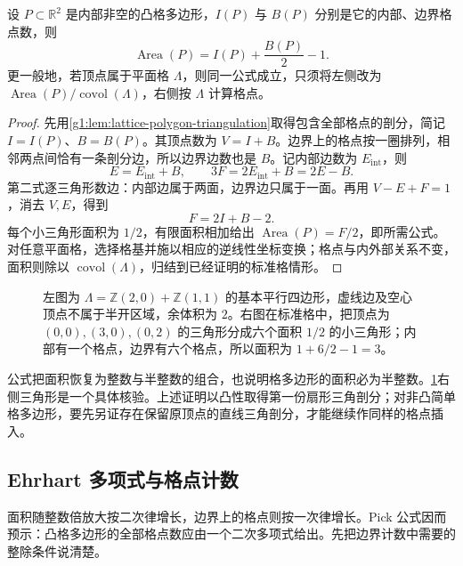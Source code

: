 \begin{theorem}[Pick 公式]
	\label{g1:thm:pick-formula}
	设 \(P\subset\mathbb R^2\) 是内部非空的凸格多边形，\(I(P)\) 与 \(B(P)\) 分别是它的内部、边界格点数，则
	\begin{equation}
		\label{g1:eq:pick-formula}
		\operatorname{Area}(P)=I(P)+\frac{B(P)}2-1.
	\end{equation}
	更一般地，若顶点属于平面格 \(\Lambda\)，则同一公式成立，只须将左侧改为 \(\operatorname{Area}(P)/\operatorname{covol}(\Lambda)\)，右侧按 \(\Lambda\) 计算格点。
\end{theorem}
\begin{proof}
	先用\cref{g1:lem:lattice-polygon-triangulation}取得包含全部格点的剖分，简记 \(I=I(P)\)、\(B=B(P)\)。其顶点数为 \(V=I+B\)。边界上的格点按一圈排列，相邻两点间恰有一条剖分边，所以边界边数也是 \(B\)。记内部边数为 \(E_{\mathrm{int}}\)，则
	\[
		E=E_{\mathrm{int}}+B,\qquad
		3F=2E_{\mathrm{int}}+B=2E-B.
	\]
	第二式逐三角形数边：内部边属于两面，边界边只属于一面。再用 \(V-E+F=1\)，消去 \(V,E\)，得到
	\[
		F=2I+B-2.
	\]
	每个小三角形面积为 \(1/2\)，有限面积相加给出 \(\operatorname{Area}(P)=F/2\)，即所需公式。对任意平面格，选择格基并施以相应的逆线性坐标变换；格点与内外部关系不变，面积则除以 \(\operatorname{covol}(\Lambda)\)，归结到已经证明的标准格情形。
\end{proof}

\begin{figure}[htbp]
	\centering
	
	\caption[基本区域与格三角剖分]{左图为 \(\Lambda=\mathbb Z(2,0)+\mathbb Z(1,1)\) 的基本平行四边形，虚线边及空心顶点不属于半开区域，余体积为 \(2\)。右图在标准格中，把顶点为 \((0,0),(3,0),(0,2)\) 的三角形分成六个面积 \(1/2\) 的小三角形；内部有一个格点，边界有六个格点，所以面积为 \(1+6/2-1=3\)。}
	\label{g1:fig:lattice-fundamental-pick}
\end{figure}

公式把面积恢复为整数与半整数的组合，也说明格多边形的面积必为半整数。\cref{g1:fig:lattice-fundamental-pick}右侧三角形是一个具体核验。上述证明以凸性取得第一份扇形三角剖分；对非凸简单格多边形，要先另证存在保留原顶点的直线三角剖分，才能继续作同样的格点插入。

\subsection{Ehrhart 多项式与格点计数}
\label{g1:subsec:B01:03}

面积随整数倍放大按二次律增长，边界上的格点则按一次律增长。Pick 公式因而预示：凸格多边形的全部格点数应由一个二次多项式给出。先把边界计数中需要的整除条件说清楚。

